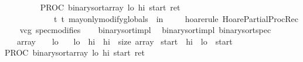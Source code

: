 \begin{isabellebody}
\ \ \isanewline
\ \ {\isachardoublequoteopen}{\isasymforall}\ {\isasymsigma}{\isachardot}\ {\isasymGamma}{\isasymturnstile}\ {\isacharbraceleft}{\isasymsigma}{\isacharbraceright}\ PROC\ binary{\isacharunderscore}sort{\isacharparenleft}{\isasymacute}array{\isacharcomma}\ {\isasymacute}lo{\isacharcomma}\ {\isasymacute}hi{\isacharcomma}\ {\isasymacute}start{\isacharcomma}\ {\isasymacute}ret{\isacharparenright}\isanewline
\ \ \ \ \ \ \ \ \ \ \ \ {\isacharbraceleft}t{\isachardot}\ t\ may{\isacharunderscore}only{\isacharunderscore}modify{\isacharunderscore}globals\ {\isasymsigma}\ in\ {\isacharbrackleft}{\isacharbrackright}{\isacharbraceright}{\isachardoublequoteclose}\isanewline
%
\isadelimproof
\ \ %
\endisadelimproof
%
\isatagproof
{}\isamarkupfalse%
\ {\isacharparenleft}hoare{\isacharunderscore}rule\ HoarePartial{\isachardot}ProcRec{}{\isacharparenright}\isanewline
\ \ \isamarkupfalse%
\ {\isacharparenleft}vcg\ spec{\isacharequal}modifies{\isacharparenright}\isanewline
\ \ \isamarkupfalse%
%
\endisatagproof
{\isafoldproof}%
%
\isadelimproof
\isanewline
%
\endisadelimproof
\isanewline
{}\isamarkupfalse%
\ binary{\isacharunderscore}sort{\isacharunderscore}impl\isanewline
{}\isamarkupfalse%
\ {\isacharparenleft}\ binary{\isacharunderscore}sort{\isacharunderscore}impl{\isacharparenright}\ binary{\isacharunderscore}sort{\isacharunderscore}spec{\isacharcolon}\ \isanewline
{\isachardoublequoteopen}{\isasymforall}{\isasymsigma}{\isachardot}\ {\isasymGamma}{\isasymturnstile}\ {\isasymlbrace}{\isasymsigma}{\isachardot}\ {\isacharparenleft}{\isasymacute}array\ {\isasymnoteq}\ {\isacharbrackleft}{\isacharbrackright}{\isacharparenright}\ {\isasymand}\ {\isacharparenleft}{\isasymacute}lo\ {\isasymge}\ {}{\isacharparenright}\ {\isasymand}\isanewline
{\isacharparenleft}{\isasymacute}lo\ {\isacharless}\ {\isasymacute}hi{\isacharparenright}\ {\isasymand}\ {\isacharparenleft}{\isasymacute}hi\ {\isasymle}\ size\ {\isasymacute}array{\isacharparenright}\ {\isasymand}\isanewline
{\isacharparenleft}{\isasymacute}start\ {\isasymle}\ {\isasymacute}hi{\isacharparenright}\ {\isasymand}\ {\isacharparenleft}{\isasymacute}lo\ {\isasymle}\ {\isasymacute}start{\isacharparenright}\ \ {\isasymrbrace}\isanewline
PROC\ binary{\isacharunderscore}sort{\isacharparenleft}{\isasymacute}array{\isacharcomma}\ {\isasymacute}lo{\isacharcomma}\ {\isasymacute}hi{\isacharcomma}\ {\isasymacute}start{\isacharcomma}\ {\isasymacute}ret{\isacharparenright}\isanewline

\end{isabellebody}
